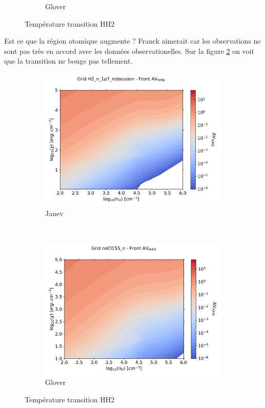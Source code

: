 \begin{figure}[!htbp]
\begin{subfigure}[t]{0.45\textwidth}
        \caption{Glover}
    \end{subfigure}
    \caption{Température transition HH2}
    \label{fig:H2:JanevGlover:THH2}
\end{figure}

Est ce que la région atomique augmente ? Franck aimerait car les observations ne sont pas très en accord avec les données observationelles. Sur la figure \ref{fig:H2:JanevGlover:AVHH2} on voit que la transition ne bouge pas tellement.

\begin{figure}[!htbp]
    \centering
    \begin{subfigure}[t]{0.45\textwidth} %
        \centering \includegraphics[trim = {0 0 0 0 },clip,width=1\textwidth]{figure/H2/JanevGlover/janev/HH2_AV_Franck.pdf}
        \caption{Janev}
    \end{subfigure}
    ~ 
    \begin{subfigure}[t]{0.45\textwidth}
        \centering \includegraphics[trim = {0 0 0 0 },clip,width=1\textwidth]{figure/H2/JanevGlover/glover/HH2_AV_Franck.pdf}
        \caption{Glover}
    \end{subfigure}
    \caption{Température transition HH2}
    \label{fig:H2:JanevGlover:AVHH2}
\end{figure}

